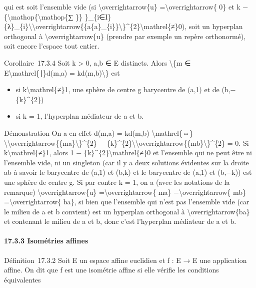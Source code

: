 \documentclass[]{article}
\begin{document}
qui est soit l'ensemble vide (si \textbackslash{}overrightarrow\{u\}
=\textbackslash{}overrightarrow\{ 0\} et k
−\{\textbackslash{}mathop\{\textbackslash{}mathop\{∑ \}\}
\}\_\{i∈I\}\{λ\}\_\{i\}\textbackslash{}\textbar{}\textbackslash{}overrightarrow\{\{a\{a\}\_\{i\}\}\textbackslash{}\textbar{}\}\^{}\{2\}\textbackslash{}mathrel\{≠\}0),
soit un hyperplan orthogonal à \textbackslash{}overrightarrow\{u\}
(prendre par exemple un repère orthonormé), soit encore l'espace tout
entier.

Corollaire~17.3.4 Soit k \textgreater{} 0, a,b ∈ E distincts. Alors
\textbackslash{}\{m ∈ E\textbackslash{}mathrel\{∣\}d(m,a) =
kd(m,b)\textbackslash{}\} est

\begin{itemize}
\itemsep1pt\parskip0pt
\item
  si k\textbackslash{}mathrel\{≠\}1, une sphère de centre g barycentre
  de (a,1) et de (b,−\{k\}\^{}\{2\})
\item
  si k = 1, l'hyperplan médiateur de a et b.
\end{itemize}

Démonstration On a en effet d(m,a) = kd(m,b)
\textbackslash{}mathrel\{⇔\}
\textbackslash{}\textbar{}\textbackslash{}overrightarrow\{\{ma\}\textbackslash{}\textbar{}\}\^{}\{2\}
−
\{k\}\^{}\{2\}\textbackslash{}\textbar{}\textbackslash{}overrightarrow\{\{mb\}\textbackslash{}\textbar{}\}\^{}\{2\}
= 0. Si k\textbackslash{}mathrel\{≠\}1, alors 1 −
\{k\}\^{}\{2\}\textbackslash{}mathrel\{≠\}0 et l'ensemble qui ne peut
être ni l'ensemble vide, ni un singleton (car il y a deux solutions
évidentes sur la droite ab à savoir le barycentre de (a,1) et (b,k) et
le barycentre de (a,1) et (b,−k)) est une sphère de centre g. Si par
contre k = 1, on a (avec les notations de la remarque)
\textbackslash{}overrightarrow\{u\} =\textbackslash{}overrightarrow\{
ma\} −\textbackslash{}overrightarrow\{ mb\}
=\textbackslash{}overrightarrow\{ ba\}, si bien que l'ensemble qui n'est
pas l'ensemble vide (car le milieu de a et b convient) est un hyperplan
orthogonal à \textbackslash{}overrightarrow\{ba\} et contenant le milieu
de a et b, donc c'est l'hyperplan médiateur de a et b.

\paragraph{17.3.3 Isométries affines}

Définition~17.3.2 Soit E un espace affine euclidien et f : E → E une
application affine. On dit que f est une isométrie affine si elle
vérifie les conditions équivalentes
\end{document}

